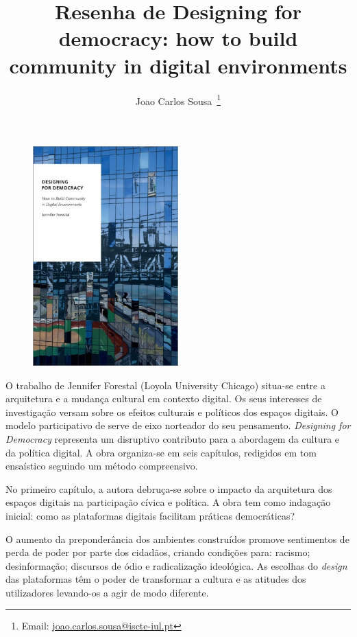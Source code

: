 \documentclass[portuguese]{textolivre}
\title{Resenha de Designing for democracy: how to build community in digital environments}
\author[1]{Joao Carlos Sousa~\orcid{0000-0002-7374-0152}\thanks{Email: \href{mailto:joao.carlos.sousa@iscte-iul.pt}{joao.carlos.sousa@iscte-iul.pt}}}
\affil[1]{Instituto Universitário de Lisboa, Centro de Investigação e Estudos em Sociologia, Lisboa, Portugal.}
\begin{document}
\maketitle

\begin{figure}[htbp]
 \centering
 \includegraphics[width=0.5\textwidth]{Fig1.jpg}
 \caption*{}
 \label{fig01}
\end{figure}

O trabalho de Jennifer Forestal (Loyola University Chicago) situa-se entre a arquitetura e a mudança cultural em contexto digital. Os seus interesses de investigação versam sobre os efeitos culturais e políticos dos espaços digitais. O modelo participativo de \textcite{dewey_democracy_2015} serve de eixo norteador do seu pensamento. \textit{Designing for Democracy} representa um disruptivo contributo para a abordagem da cultura e da política digital. A obra organiza-se em seis capítulos, redigidos em tom ensaístico seguindo um método compreensivo.

No primeiro capítulo, a autora debruça-se sobre o impacto da arquitetura dos espaços digitais na participação cívica e política. A obra tem como indagação inicial: como as plataformas digitais facilitam práticas democráticas?

O aumento da preponderância dos ambientes construídos promove sentimentos de perda de poder por parte dos cidadãos, criando condições para: racismo; desinformação; discursos de ódio e radicalização ideológica. As escolhas do \textit{design} das plataformas têm o poder de transformar a cultura e as atitudes dos utilizadores levando-os a agir de modo diferente.
\end{document}
